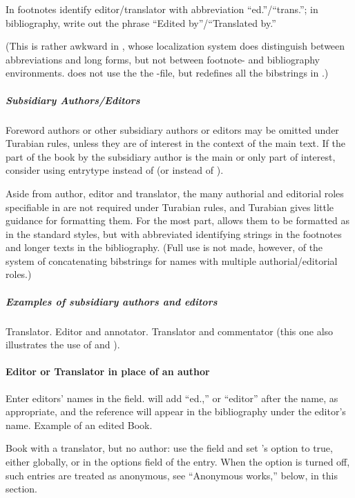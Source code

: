 \documentclass{ltxdockit}[2010/02/12]
\begin{document}
In footnotes identify editor/translator with abbreviation ``ed.''/``trans.''; in bibliography, write out the phrase ``Edited by''/``Translated by.''  

(This is rather awkward in , whose localization system does distinguish between abbreviations and long forms, but not between footnote- and bibliography environments.  does not use the  the -file, but redefines all the bibstrings in .)

\subparagraph{Subsidiary Authors/Editors \label{authoredannote}}
Foreword authors or other subsidiary authors or editors may be omitted under Turabian rules, unless they are of interest in the context of the main text. If the part of the book by the subsidiary author is the main or only part of interest, consider using entrytype  instead of  (or   instead of ). 

Aside from author, editor and translator, the many authorial and editorial roles specifiable in  are not required under Turabian rules, and Turabian gives little guidance for formatting them. For the most part,  allows them to be formatted as in the  standard styles, but with abbreviated identifying strings in the footnotes and longer texts in the bibliography. (Full use is not made, however, of the  system of concatenating bibstrings for names with multiple authorial/editorial roles.)

\subparagraph{Examples of subsidiary authors and editors}
Translator.\autocites[][]{nordenskiold1936the-history}
Editor and annotator.\autocites[][]{darwin1958the-autobiograp}
Translator and commentator (this one also illustrates the use of  and ).\autocites[][]{2482}

\paragraph{Editor or Translator in place of an author} 
Enter editors' names in the  field.  will add ``ed.,'' or ``editor'' after the name, as appropriate, and the reference will appear in the bibliography under the editor's name. 
Example of an edited Book.\autocites[][]{2009going-amiss}

Book with a translator, but no author: use the field  and set 's  option to true, either globally, or in the options field of the entry.\autocites[][]{silverstein:1974}
 When the option is turned off, such entries are treated as anonymous, see ``Anonymous works,'' below, in this section.
\end{document}
